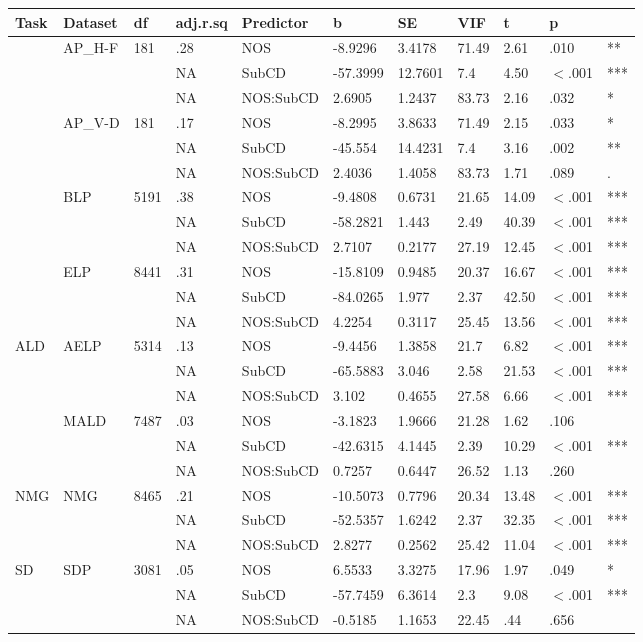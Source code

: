 \begin{table}[ht]
\centering
\begingroup\normalsize
\begin{tabular}{lllllllllll}
  \hline
Task & Dataset & df & adj.r.sq & Predictor & b & SE & VIF & t & p &  \\ 
  \hline
 & AP\_H-F & 181 & .28 & NOS & -8.9296 & 3.4178 & 71.49 & 2.61 & .010 & ** \\ 
   &  &  & NA & SubCD & -57.3999 & 12.7601 & 7.4 & 4.50 & $<$.001 & *** \\ 
   &  &  & NA & NOS:SubCD & 2.6905 & 1.2437 & 83.73 & 2.16 & .032 & * \\ 
   & AP\_V-D & 181 & .17 & NOS & -8.2995 & 3.8633 & 71.49 & 2.15 & .033 & * \\ 
   &  &  & NA & SubCD & -45.554 & 14.4231 & 7.4 & 3.16 & .002 & ** \\ 
   &  &  & NA & NOS:SubCD & 2.4036 & 1.4058 & 83.73 & 1.71 & .089 & . \\ 
   & BLP & 5191 & .38 & NOS & -9.4808 & 0.6731 & 21.65 & 14.09 & $<$.001 & *** \\ 
   &  &  & NA & SubCD & -58.2821 & 1.443 & 2.49 & 40.39 & $<$.001 & *** \\ 
   &  &  & NA & NOS:SubCD & 2.7107 & 0.2177 & 27.19 & 12.45 & $<$.001 & *** \\ 
   & ELP & 8441 & .31 & NOS & -15.8109 & 0.9485 & 20.37 & 16.67 & $<$.001 & *** \\ 
   &  &  & NA & SubCD & -84.0265 & 1.977 & 2.37 & 42.50 & $<$.001 & *** \\ 
   &  &  & NA & NOS:SubCD & 4.2254 & 0.3117 & 25.45 & 13.56 & $<$.001 & *** \\ 
  ALD & AELP & 5314 & .13 & NOS & -9.4456 & 1.3858 & 21.7 & 6.82 & $<$.001 & *** \\ 
   &  &  & NA & SubCD & -65.5883 & 3.046 & 2.58 & 21.53 & $<$.001 & *** \\ 
   &  &  & NA & NOS:SubCD & 3.102 & 0.4655 & 27.58 & 6.66 & $<$.001 & *** \\ 
   & MALD & 7487 & .03 & NOS & -3.1823 & 1.9666 & 21.28 & 1.62 & .106 &   \\ 
   &  &  & NA & SubCD & -42.6315 & 4.1445 & 2.39 & 10.29 & $<$.001 & *** \\ 
   &  &  & NA & NOS:SubCD & 0.7257 & 0.6447 & 26.52 & 1.13 & .260 &   \\ 
  NMG & NMG & 8465 & .21 & NOS & -10.5073 & 0.7796 & 20.34 & 13.48 & $<$.001 & *** \\ 
   &  &  & NA & SubCD & -52.5357 & 1.6242 & 2.37 & 32.35 & $<$.001 & *** \\ 
   &  &  & NA & NOS:SubCD & 2.8277 & 0.2562 & 25.42 & 11.04 & $<$.001 & *** \\ 
  SD & SDP & 3081 & .05 & NOS & 6.5533 & 3.3275 & 17.96 & 1.97 & .049 & * \\ 
   &  &  & NA & SubCD & -57.7459 & 6.3614 & 2.3 & 9.08 & $<$.001 & *** \\ 
   &  &  & NA & NOS:SubCD & -0.5185 & 1.1653 & 22.45 & .44 & .656 &   \\ 
   \hline
\end{tabular}
\endgroup
\end{table}
